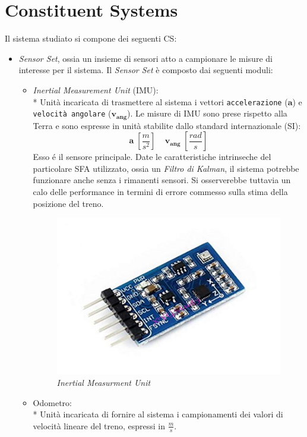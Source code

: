 \section{Constituent Systems}
Il sistema studiato si compone dei seguenti CS:
\begin{itemize}
	\item \emph{Sensor Set}, ossia un insieme di sensori atto a campionare le misure di interesse per il sistema. Il \emph{Sensor Set} \`e composto dai seguenti moduli:
	\begin{itemize}
		\item \emph{Inertial Measurement Unit} (IMU):\\*
		Unit\`a incaricata di trasmettere al sistema i vettori \texttt{accelerazione} ($\mathbf{a}$) e \texttt{velocit\`a angolare} ($\mathbf{v_{ang}}$). Le misure di IMU sono prese rispetto alla Terra e sono espresse in unit\`a stabilite dallo standard internazionale (SI):
		$$
		\mathbf{a}\;\left[\frac{m}{s^2}\right]\;\;\;\;\mathbf{v_{ang}}\;\left[ \frac{rad}{s} \right]
		$$
		Esso \'e il sensore principale. Date le caratteristiche intrinseche del particolare SFA utilizzato, ossia un \emph{Filtro di Kalman}, il sistema potrebbe funzionare anche senza i rimanenti sensori. Si osserverebbe tuttavia un calo delle performance in termini di errore commesso sulla stima della posizione del treno. \cite{partialmeas}
		\begin{figure}[h]
			\centering
			\includegraphics[scale=0.5]{img/imu}
			\caption{\emph{Inertial Measurment Unit}}
			\label{fig:imu}
		\end{figure}
		\item Odometro:\\*
		Unit\`a incaricata di fornire al sistema i campionamenti dei valori di velocit\`a lineare del treno, espressi in $\frac{m}{s}$.

\end{itemize}
\end{itemize}

